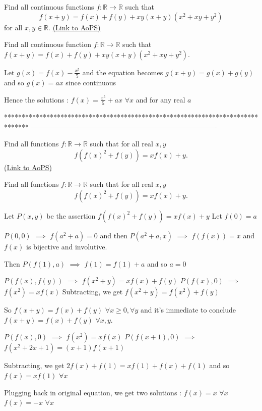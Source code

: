 \begin{problem}
	Find all continuous functions $f: \mathbb{R}\to\mathbb{R}$ such that \[f(x+y)=f(x)+f(y)+xy(x+y)(x^2+xy+y^2)\] for all $x,y \in \mathbb R$.
	\flushright \href{https://artofproblemsolving.com/community/c6h413826}{(Link to AoPS)}
\end{problem}



\begin{solution}
	\begin{tcolorbox}Find all continuous function $f: \mathbb{R}\to\mathbb{R}$ such that $f(x+y)=f(x)+f(y)+xy(x+y)(x^2+xy+y^2)$.\end{tcolorbox}
Let $g(x)=f(x)-\frac{x^5}5$ and the equation becomes $g(x+y)=g(x)+g(y)$ and so $g(x)=ax$ since continuous

Hence the solutions : $\boxed{f(x)=\frac{x^5}5+ax}$ $\forall x$ and for any real $a$
\end{solution}
*******************************************************************************
-------------------------------------------------------------------------------

\begin{problem}
	Find all functions $f :\mathbb R \to \mathbb R$ such that for all real $x, y$
\[f(f(x)^2 + f(y)) = xf(x) + y.\]
	\flushright \href{https://artofproblemsolving.com/community/c6h414395}{(Link to AoPS)}
\end{problem}



\begin{solution}
	\begin{tcolorbox}Find all functions $f :\mathbb R \to \mathbb R$ such that for all real $x, y$
\[f(f(x)^2 + f(y)) = xf(x) + y.\]\end{tcolorbox}
Let $P(x,y)$ be the assertion $f(f(x)^2+f(y))=xf(x)+y$
Let $f(0)=a$

$P(0,0)$ $\implies$ $f(a^2+a)=0$ and then  $P(a^2+a,x)$ $\implies$ $f(f(x))=x$ and $f(x)$ is bijective and involutive.

Then $P(f(1),a)$ $\implies$ $f(1)=f(1)+a$ and so $a=0$

$P(f(x),f(y))$ $\implies$ $f(x^2+y)=xf(x)+f(y)$
$P(f(x),0)$ $\implies$ $f(x^2)=xf(x)$
Subtracting, we get $f(x^2+y)=f(x^2)+f(y)$

So $f(x+y)=f(x)+f(y)$ $\forall x\ge 0,\forall y$ and it's immediate to conclude $f(x+y)=f(x)+f(y)$ $\forall x,y$.

$P(f(x),0)$ $\implies$ $f(x^2)=xf(x)$
$P(f(x+1),0)$ $\implies$ $f(x^2+2x+1)=(x+1)f(x+1)$

Subtracting, we get $2f(x)+f(1)=xf(1)+f(x)+f(1)$ and so $f(x)=xf(1)$ $\forall x$

Plugging back in original equation, we get two solutions :
$f(x)=x$ $\forall x$
$f(x)=-x$ $\forall x$
\end{solution}




